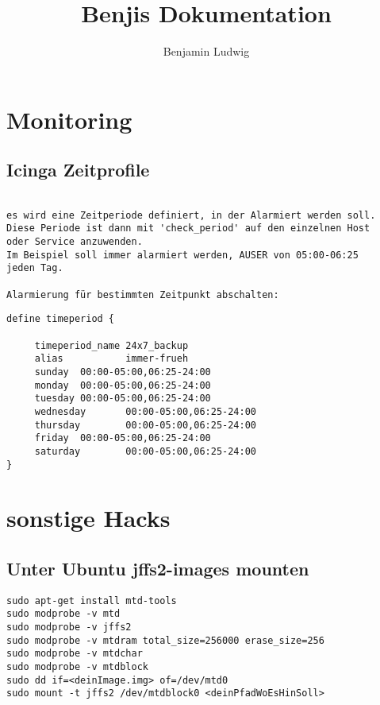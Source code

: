 \documentclass[a4paper,10pt]{report}
\title{Benjis Dokumentation}
\author{Benjamin Ludwig}
\date{}
\begin{document}
 
\maketitle
\hypersetup{
    colorlinks,
    citecolor=black,
    filecolor=black,
    linkcolor=black,
    urlcolor=black
    linktocpage
}
\tableofcontents
\chapter{Monitoring}
\section{Icinga Zeitprofile}


\begin{verbatim}

es wird eine Zeitperiode definiert, in der Alarmiert werden soll. 
Diese Periode ist dann mit 'check_period' auf den einzelnen Host 
oder Service anzuwenden. 
Im Beispiel soll immer alarmiert werden, AUSER von 05:00-06:25 
jeden Tag. 

Alarmierung für bestimmten Zeitpunkt abschalten:
\end{verbatim}

{\Large
\begin{verbatim}
define timeperiod {

     timeperiod_name 24x7_backup
     alias           immer-frueh
     sunday  00:00-05:00,06:25-24:00
     monday  00:00-05:00,06:25-24:00
     tuesday 00:00-05:00,06:25-24:00
     wednesday       00:00-05:00,06:25-24:00
     thursday        00:00-05:00,06:25-24:00
     friday  00:00-05:00,06:25-24:00
     saturday        00:00-05:00,06:25-24:00
}

\end{verbatim}
}
\chapter{sonstige Hacks}
\section{Unter Ubuntu jffs2-images mounten}
\begin{verbatim}
sudo apt-get install mtd-tools
sudo modprobe -v mtd
sudo modprobe -v jffs2
sudo modprobe -v mtdram total_size=256000 erase_size=256
sudo modprobe -v mtdchar
sudo modprobe -v mtdblock
sudo dd if=<deinImage.img> of=/dev/mtd0
sudo mount -t jffs2 /dev/mtdblock0 <deinPfadWoEsHinSoll>
\end{verbatim}
\end{document}
